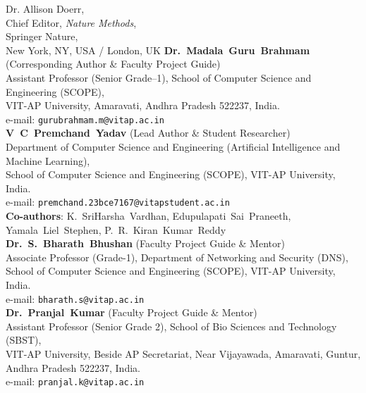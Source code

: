 \documentclass[11pt]{letter}
\begin{document}
\begin{letter}{%
    Dr. Allison Doerr,\\
    Chief Editor, \textit{Nature Methods},\\
    Springer Nature,\\
    New York, NY, USA / London, UK
}
\noindent
\textbf{Dr.~Madala~Guru~Brahmam} (Corresponding Author \& Faculty Project Guide)\\
Assistant Professor (Senior Grade--1), School of Computer Science and Engineering (SCOPE),\\
VIT-AP University, Amaravati, Andhra Pradesh 522237, India.\\
e-mail: \texttt{gurubrahmam.m@vitap.ac.in}\\[1em]
\textbf{V~C~Premchand~Yadav} (Lead Author \& Student Researcher)\\
Department of Computer Science and Engineering (Artificial Intelligence and Machine Learning),\\
School of Computer Science and Engineering (SCOPE), VIT-AP University, India.\\
e-mail: \texttt{premchand.23bce7167@vitapstudent.ac.in}\\[0.5em]
\textbf{Co-authors}: K.~SriHarsha~Vardhan, Edupulapati~Sai~Praneeth, Yamala~Liel~Stephen, P.~R.~Kiran~Kumar~Reddy\\[0.5em]
\textbf{Dr.~S.~Bharath~Bhushan} (Faculty Project Guide \& Mentor)\\
Associate Professor (Grade-1), Department of Networking and Security (DNS),\\
School of Computer Science and Engineering (SCOPE), VIT-AP University, India.\\
e-mail: \texttt{bharath.s@vitap.ac.in}\\[0.5em]
\textbf{Dr.~Pranjal~Kumar} (Faculty Project Guide \& Mentor)\\
Assistant Professor (Senior Grade 2), School of Bio Sciences and Technology (SBST),\\
VIT-AP University, Beside AP Secretariat, Near Vijayawada, Amaravati, Guntur, Andhra Pradesh 522237, India.\\
e-mail: \texttt{pranjal.k@vitap.ac.in}

\end{letter}
\end{document}
